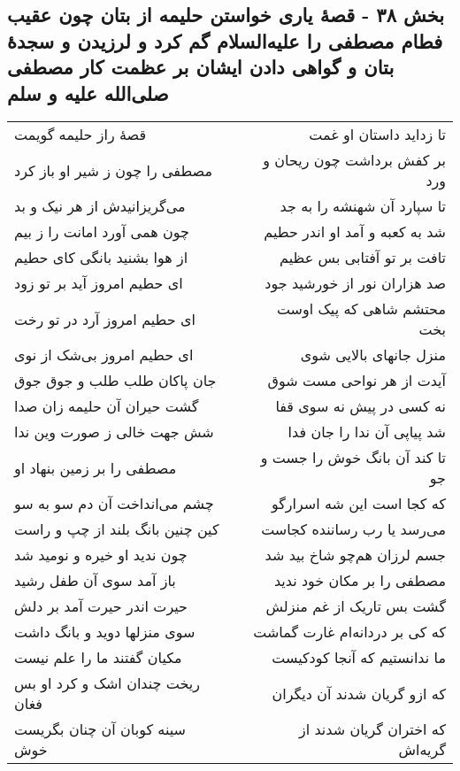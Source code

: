 \begin{center}
\section*{بخش ۳۸ - قصهٔ یاری خواستن حلیمه از بتان چون عقیب فطام مصطفی را علیه‌السلام گم کرد و لرزیدن و سجدهٔ بتان و گواهی دادن ایشان بر عظمت کار  مصطفی صلی‌الله علیه و سلم}
\label{sec:sh038}
\begin{longtable}{l p{0.5cm} r}
قصهٔ راز حلیمه گویمت
&&
تا زداید داستان او غمت
\\
مصطفی را چون ز شیر او باز کرد
&&
بر کفش برداشت چون ریحان و ورد
\\
می‌گریزانیدش از هر نیک و بد
&&
تا سپارد آن شهنشه را به جد
\\
چون همی آورد امانت را ز بیم
&&
شد به کعبه و آمد او اندر حطیم
\\
از هوا بشنید بانگی کای حطیم
&&
تافت بر تو آفتابی بس عظیم
\\
ای حطیم امروز آید بر تو زود
&&
صد هزاران نور از خورشید جود
\\
ای حطیم امروز آرد در تو رخت
&&
محتشم شاهی که پیک اوست بخت
\\
ای حطیم امروز بی‌شک از نوی
&&
منزل جانهای بالایی شوی
\\
جان پاکان طلب طلب و جوق جوق
&&
آیدت از هر نواحی مست شوق
\\
گشت حیران آن حلیمه زان صدا
&&
نه کسی در پیش نه سوی قفا
\\
شش جهت خالی ز صورت وین ندا
&&
شد پیاپی آن ندا را جان فدا
\\
مصطفی را بر زمین بنهاد او
&&
تا کند آن بانگ خوش را جست و جو
\\
چشم می‌انداخت آن دم سو به سو
&&
که کجا است این شه اسرارگو
\\
کین چنین بانگ بلند از چپ و راست
&&
می‌رسد یا رب رساننده کجاست
\\
چون ندید او خیره و نومید شد
&&
جسم لرزان هم‌چو شاخ بید شد
\\
باز آمد سوی آن طفل رشید
&&
مصطفی را بر مکان خود ندید
\\
حیرت اندر حیرت آمد بر دلش
&&
گشت بس تاریک از غم منزلش
\\
سوی منزلها دوید و بانگ داشت
&&
که کی بر دردانه‌ام غارت گماشت
\\
مکیان گفتند ما را علم نیست
&&
ما ندانستیم که آنجا کودکیست
\\
ریخت چندان اشک و کرد او بس فغان
&&
که ازو گریان شدند آن دیگران
\\
سینه کوبان آن چنان بگریست خوش
&&
که اختران گریان شدند از گریه‌اش
\\
\end{longtable}
\end{center}
